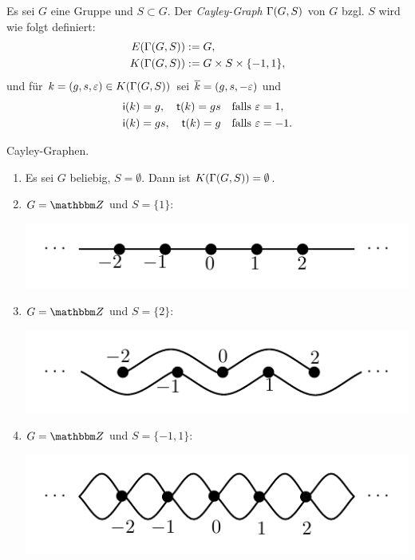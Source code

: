 \documentclass[a4paper, 12pt, twoside]{article}
\begin{document}
\DB Es sei $G$ eine Gruppe und $S\subset G$.
Der \emph{Cayley-Graph}
$\Gamma(G,S)$ von $G$ bzgl. $S$ wird wie folgt definiert:
\begin{align*}
E(\Gamma(G,S)) &:= G, \\
K(\Gamma(G,S)) &:= G \times S \times \{-1,1\},
\end{align*}
und für $k=(g,s,\varepsilon)\in K(\Gamma(G,S))$ sei $\overline{k}=(g,s,-\varepsilon)$
und
\begin{align*}
&\mathsf{i}(k) = g, \quad \mathsf{t}(k) = gs \quad \text{falls } \varepsilon = 1, \\
&\mathsf{i}(k) = gs, \quad \mathsf{t}(k) = g \quad \text{falls } \varepsilon = -1.
\end{align*}

\BSP\label{bsp_cay}
Cayley-Graphen.
\begin{enumerate}
\item Es sei $G$ beliebig, $S=\emptyset$.
Dann ist $K(\Gamma(G,S))=\emptyset$.
\item $G=\ZZ$ und $S=\{1\}$:
\begin{center}
	\includegraphics{grugraImages/cay1}
\end{center}
\item $G=\ZZ$ und $S=\{2\}$:
\begin{center}
	\includegraphics{grugraImages/cay3}
\end{center}
\item $G=\ZZ$ und $S=\{-1,1\}$:
\begin{center}
	\includegraphics{grugraImages/cay2}
\end{center}

\end{enumerate}
\end{document}
